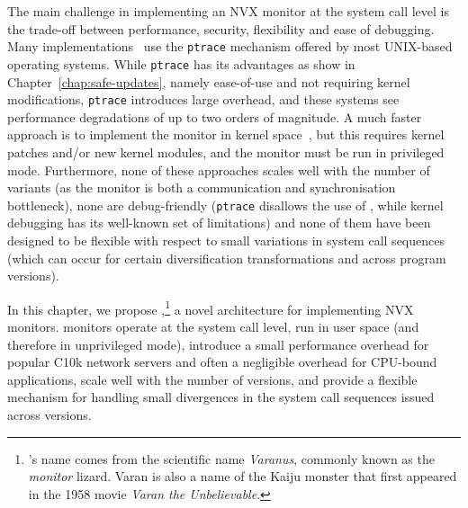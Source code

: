 
The main challenge in implementing an NVX monitor at the system call
level is the trade-off between performance, security, flexibility and
ease of debugging.  Many
implementations~\cite{orchestra09,mx,process-replicae07} use the
\lstinline`ptrace` mechanism offered by most UNIX-based operating
systems. While \lstinline`ptrace` has its advantages as show in
Chapter~\ref{chap:safe-updates}, namely ease-of-use and not requiring
kernel modifications, \lstinline`ptrace` introduces large overhead, and
these systems see performance degradations of up to two orders of
magnitude.  A much faster approach is to implement the monitor in kernel
space~\cite{cox2006}, but this requires kernel patches and/or new kernel
modules, and the monitor must be run in privileged mode.  Furthermore,
none of these approaches scales well with the number of variants (as the
monitor is both a communication and synchronisation bottleneck), none
are debug-friendly (\lstinline`ptrace` disallows the use of \gdb, while
kernel debugging has its well-known set of limitations) and none of them
have been designed to be flexible with respect to small variations in
system call sequences (which can occur for certain diversification
transformations and across program versions).

In this chapter, we propose \varan,\footnote{\varan's name comes from
  the scientific name \emph{Varanus}, commonly known as the
  \emph{monitor} lizard. Varan is also a name of the Kaiju monster
  that first appeared in the 1958 movie \emph{Varan the
    Unbelievable}.} a novel architecture for implementing NVX
monitors.  \varan monitors operate at the system call level, run in
user space (and therefore in unprivileged mode), introduce a small
performance overhead for popular C10k network servers and often a
negligible overhead for CPU-bound applications, scale well with the
number of versions, and provide a flexible mechanism for handling small
divergences in the system call sequences issued across versions.








